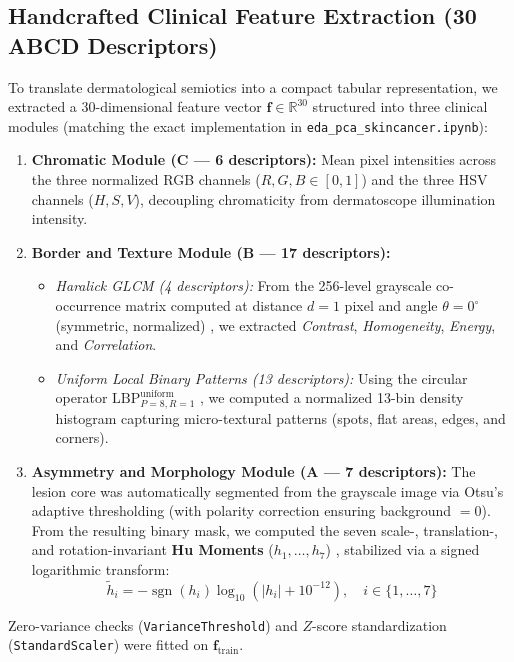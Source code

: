 \documentclass[11pt,a4paper]{article}
\begin{document}
\subsection{Handcrafted Clinical Feature Extraction (30 ABCD Descriptors)}
To translate dermatological semiotics into a compact tabular representation, we extracted a 30-dimensional feature vector $\mathbf{f} \in \mathbb{R}^{30}$ structured into three clinical modules (matching the exact implementation in \texttt{eda\_pca\_skincancer.ipynb}):
\begin{enumerate}
    \item \textbf{Chromatic Module (C --- 6 descriptors):} Mean pixel intensities across the three normalized RGB channels ($R, G, B \in [0, 1]$) and the three HSV channels ($H, S, V$), decoupling chromaticity from dermatoscope illumination intensity.
    \item \textbf{Border and Texture Module (B --- 17 descriptors):}
    \begin{itemize}
        \item \textit{Haralick GLCM (4 descriptors):} From the 256-level grayscale co-occurrence matrix computed at distance $d=1$ pixel and angle $\theta=0^\circ$ (symmetric, normalized) \cite{haralick1973}, we extracted \textit{Contrast}, \textit{Homogeneity}, \textit{Energy}, and \textit{Correlation}.
        \item \textit{Uniform Local Binary Patterns (13 descriptors):} Using the circular operator $\text{LBP}_{P=8, R=1}^{\text{uniform}}$ \cite{ojala2002}, we computed a normalized 13-bin density histogram capturing micro-textural patterns (spots, flat areas, edges, and corners).
    \end{itemize}
    \item \textbf{Asymmetry and Morphology Module (A --- 7 descriptors):} The lesion core was automatically segmented from the grayscale image via Otsu's adaptive thresholding \cite{otsu1979} (with polarity correction ensuring background $= 0$). From the resulting binary mask, we computed the seven scale-, translation-, and rotation-invariant \textbf{Hu Moments} ($h_1, \dots, h_7$) \cite{hu1962}, stabilized via a signed logarithmic transform:
    \begin{equation}
        \tilde{h}_i = -\operatorname{sgn}(h_i) \log_{10}\!\left(|h_i| + 10^{-12}\right), \quad i \in \{1, \dots, 7\}
    \end{equation}
\end{enumerate}
Zero-variance checks (\texttt{VarianceThreshold}) and $Z$-score standardization (\texttt{StandardScaler}) were fitted on $\mathbf{f}_{\text{train}}$.
\end{document}
